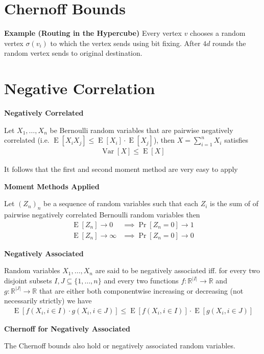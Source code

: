 \documentclass[25pt]{sciposter}
\newcommand{\R}{\mathbb{R}}
\newcommand{\Var}{\operatorname{Var}}
\newcommand{\E}{\operatorname{E}}
\newenvironment{method}[1]{\begin{mdframed}[backgroundcolor=blue!10,innertopmargin=15pt, innerbottommargin=15pt,nobreak=true]
		\textbf{#1 }
	}
	{ 
	\end{mdframed}
}
\newenvironment{thm}[1]{\begin{mdframed}[backgroundcolor=pink!20,innertopmargin=15pt, innerbottommargin=15pt, nobreak=true]
		\textbf{#1 }
	}
	{ 
	\end{mdframed}
}
\newenvironment{defn}[1]{\begin{mdframed}[backgroundcolor=PineGreen!20,innertopmargin=15pt, innerbottommargin=15pt, nobreak=true]
		\textbf{#1 }
	}
	{ 
	\end{mdframed}
}
\begin{document}
\begin{multicols}{3}
		
		
		\section{Chernoff Bounds}
		
		\textbf{Example (Routing in the Hypercube)} Every vertex $v$ chooses a random vertex $\sigma(v_i)$ to which the vertex sends using bit fixing. After $4d$ rounds the random vertex sends to original destination. 
		
		
		\section{Negative Correlation}
		
		\begin{method}{Negatively Correlated}
			Let $X_1, \ldots, X_n$ be Bernoulli random variables that are pairwise negatively correlated (i.e. $\E[X_i X_j] \leq\E[X_i] \cdot \E[X_j] $), then $X = \sum_{i=1}^{n} X_i$ satisfies
			\begin{align*}
				\Var[X] \leq \E[X]
				\end{align*}
		\end{method}
		It follows that the first and second moment method are very easy to apply
		\begin{thm}{Moment Methods Applied}
Let $(Z_n)_n$ be a sequence of random variables such that each $Z_i$ is the sum of of pairwise negatively correlated Bernoulli random variables then
\begin{align*}
	\E[Z_n] \to 0 &\implies \Pr[Z_n = 0] \to 1\\
	\E[Z_n] \to \infty &\implies \Pr[Z_n = 0] \to 0
\end{align*}
		\end{thm}	
	
	\begin{defn}{Negatively Associated}
	Random variables $X_1, \ldots, X_n$ are said to be negatively associated iff. for every two disjoint subsets $I,J \subseteq \{1,\ldots,n\}$ and every two functions $f:\R^{|I|} \to \R$ and $g:\R^{|J|} \to \R$ that are either both componentwise increasing or decreasing (not necessarily strictly) we have 
	\begin{align*}
		\E[f(X_i, i\in I) \cdot g(X_i, i\in J) ]\leq \E[f(X_i, i\in I)] \cdot \E[g(X_i, i\in J)]
	\end{align*}
	\end{defn}
	
	\begin{method}{Chernoff for Negatively Associated}
		The Chernoff bounds also hold or negatively associated random variables.
	\end{method}


\end{multicols}
\end{document}
